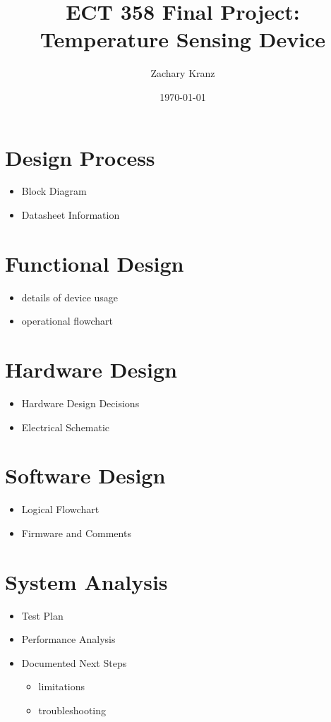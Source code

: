 \documentclass[12pt]{article}
\title{ECT 358 Final Project: Temperature Sensing Device}
\date{\today}
\author{Zachary Kranz}
\begin{document}
\maketitle

\section{Design Process}
\begin{itemize}
	\item Block Diagram
	\item Datasheet Information
\end{itemize}

\section{Functional Design}
\begin{itemize}
	\item details of device usage
	\item operational flowchart
\end{itemize}

\section{Hardware Design}
\begin{itemize}
	\item Hardware Design Decisions
	\item Electrical Schematic
\end{itemize}

\section{Software Design}
\begin{itemize}
	\item Logical Flowchart
	\item Firmware and Comments
\end{itemize}

\section{System Analysis}
\begin{itemize}
	\item Test Plan
	\item Performance Analysis
	\item Documented Next Steps
		\begin{itemize}
			\item limitations
			\item troubleshooting
		\end{itemize}
\end{itemize}
\end{document}
